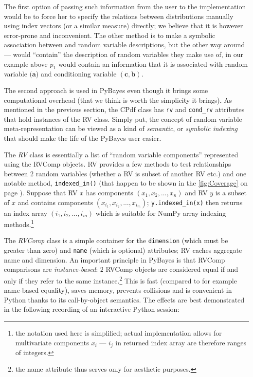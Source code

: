 The first option of passing such information from the user to the implementation would be to force
her to specify the relations between distributions manually
using index vectors (or a similar measure) directly; we believe that it is however error-prone
and inconvenient. The other method is to make a symbolic association between {\pdfs} and random
variable descriptions, but the other way around --- {\pdfs} would ``contain'' the description of
random variables they make use of, in our example above \(p_1\) would contain an information
that it is associated with random variable \((\mathbf{a}\)) and conditioning variable
\((\mathbf{c},\mathbf{b})\).

The second approach is used in PyBayes even though it brings some computational overhead (that we
think is worth the simplicity it brings). As mentioned in the previous section, the CPdf class has
\verb|rv| and \verb|cond_rv| attributes that hold instances of the RV class. Simply put, the concept
of random variable meta-representation can be viewed as a kind of \emph{semantic}, or \emph{symbolic
indexing} that should make the life of the PyBayes user easier.

The \emph{RV} class is essentially a list of ``random variable components'' represented using the
RVComp objects. RV provides a few methods to test relationships between 2 random variables
(whether a RV is subset of another RV etc.) and one notable method, \verb|indexed_in()| (that happen
to be shown in the \autoref{fig:Coverage} on page \pageref{fig:Coverage}). Suppose
that RV \(x\) has components \((x_1, x_2, \dotsc, x_n)\) and RV \(y\) is a subset of \(x\) and contains
components \((x_{i_1}, x_{i_2}, \dotsc, x_{i_m})\); \verb|y.indexed_in(x)| then returns an index array
\((i_1, i_2, \dotsc, i_m)\) which is suitable for NumPy array indexing methods.\footnote{the notation
used here is simplified; actual implementation allows for multivariate components \(x_i\) --- \(i_j\)
in returned index array are therefore ranges of integers.}

The \emph{RVComp} class is a simple container for the \verb|dimension| (which must be greater than
zero) and \verb|name| (which is optional) attributes; RV caches aggregate name and dimension. An
important principle in PyBayes is that RVComp comparisons are \emph{instance-based}: 2 RVComp
objects are considered equal if and only if they refer to the same instance.\footnote{the name
attribute thus serves only for aesthetic purposes.} This is fast (compared to for example
name-based equality), saves memory, prevents collisions and is convenient in Python thanks to its
call-by-object semantics. The effects are best demonstrated in the following recording of an
interactive Python session:

